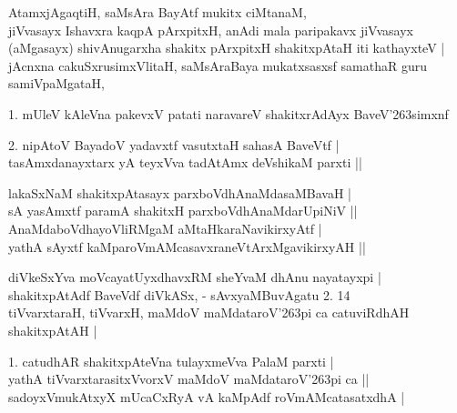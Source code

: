 \begin{entry}
\gl{}
\info{}{}{}{}
\begin{shl}
AtamxjAgaqtiH, saMsAra BayAtf mukitx ciMtanaM,\\
jiVvasayx Ishavxra kaqpA pArxpitxH, anAdi mala paripakavx jiVvasayx\\
(aMgasayx) shivAnugarxha shakitx pArxpitxH shakitxpAtaH iti kathayxteV |\\
jAcnxna cakuSxrusimxVlitaH, saMsAraBaya mukatxsasxsf samathaR guru samiVpaMgataH,
\end{shl}
\begin{shl}
1. mUleV kAleVna pakevxV patati naravareV shakitxrAdAyx BaveV\char'263simxnf
\end{shl}
\begin{shl}
2. nipAtoV BayadoV yadavxtf vasutxtaH sahasA BaveVtf |\\
tasAmxdanayxtarx yA teyxVva tadAtAmx deVshikaM parxti ||
\end{shl}
\end{entry}

\begin{entry}
\begin{shl}
lakaSxNaM shakitxpAtasayx parxboVdhAnaMdasaMBavaH |\\
sA yasAmxtf paramA shakitxH parxboVdhAnaMdarUpiNiV ||\\
AnaMdaboVdhayoVliRMgaM aMtaHkaraNavikirxyAtf |\\
yathA sAyxtf kaMparoVmAMcasavxraneVtArxMgavikirxyAH ||
\end{shl}
\end{entry}

\begin{entry}
\gl{}
\info{}{}{}{}
\begin{shl}
diVkeSxYva moVcayatUyxdhavxRM sheYvaM dhAnu nayatayxpi |\\
shakitxpAtAdf BaveVdf diVkASx, - sAvxyaMBuvAgatu 2. 14\\
tiVvarxtaraH, tiVvarxH, maMdoV maMdataroV\char'263pi ca catuviRdhAH shakitxpAtAH |
\end{shl}
\begin{shl}
1. catudhAR shakitxpAteVna tulayxmeVva PalaM parxti |\\
yathA tiVvarxtarasitxVvorxV maMdoV maMdataroV\char'263pi ca ||\\
sadoyxVmukAtxyX mUcaCxRyA vA kaMpAdf roVmAMcatasatxdhA |
\end{shl}
\end{entry}

